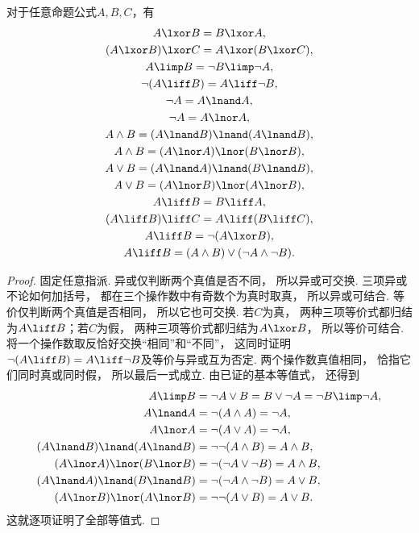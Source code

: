 \begin{theorem}
对于任意命题公式\(A,B,C\)，有\begin{gather}
	A \lxor B = B \lxor A, \\
	(A \lxor B) \lxor C = A \lxor (B \lxor C), \\
	A \limp B = \neg B \limp \neg A, \\
	\neg(A \liff B) = A \liff \neg B, \\
	\neg A = A \lnand A, \\
	\neg A = A \lnor A, \\
	A \land B = (A \lnand B) \lnand (A \lnand B), \\
	A \land B = (A \lnor A) \lnor (B \lnor B), \\
	A \lor B = (A \lnand A) \lnand (B \lnand B), \\
	A \lor B = (A \lnor B) \lnor (A \lnor B), \\
	A \liff B = B \liff A, \\
	(A \liff B) \liff C = A \liff (B \liff C), \\
	A \liff B = \neg(A \lxor B), \\
	A \liff B = (A \land B) \lor (\neg A \land \neg B).
\end{gather}
    \begin{proof}
        固定任意指派.
        异或仅判断两个真值是否不同，
        所以异或可交换.
        三项异或不论如何加括号，
        都在三个操作数中有奇数个为真时取真，
        所以异或可结合.
        等价仅判断两个真值是否相同，
        所以它也可交换.
        若\(C\)为真，
        两种三项等价式都归结为\(A\liff B\)；若\(C\)为假，
        两种三项等价式都归结为\(A\lxor B\)，
        所以等价可结合.
        将一个操作数取反恰好交换“相同”和“不同”，
        这同时证明\(\neg(A\liff B)=A\liff\neg B\)及等价与异或互为否定.
        两个操作数真值相同，
        恰指它们同时真或同时假，
        所以最后一式成立.
        由已证的基本等值式，
        还得到
        \begin{align*}
            A\limp B &= \neg A\lor B=B\lor\neg A=\neg B\limp\neg A, \\
            A\lnand A &= \neg(A\land A)=\neg A, \\
            A\lnor A &= \neg(A\lor A)=\neg A, \\
            (A\lnand B)\lnand(A\lnand B) &= \neg\neg(A\land B)=A\land B, \\
            (A\lnor A)\lnor(B\lnor B) &= \neg(\neg A\lor\neg B)=A\land B, \\
            (A\lnand A)\lnand(B\lnand B) &= \neg(\neg A\land\neg B)=A\lor B, \\
            (A\lnor B)\lnor(A\lnor B) &= \neg\neg(A\lor B)=A\lor B.
        \end{align*}
        这就逐项证明了全部等值式.
    \end{proof}
\end{theorem}

